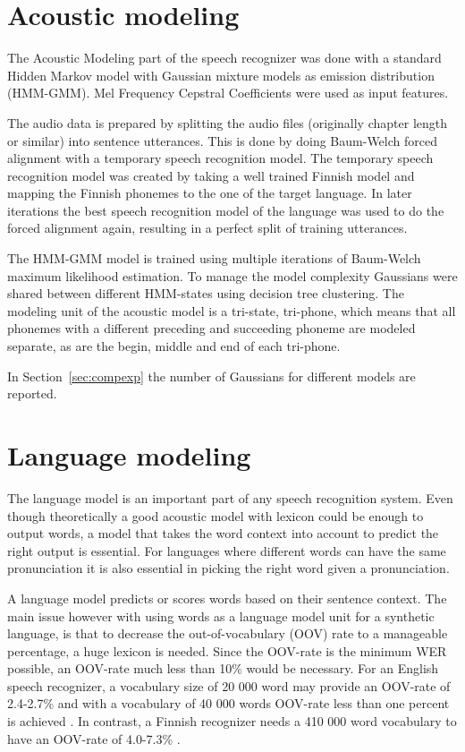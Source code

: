 \documentclass[b5paper]{article}
\newcommand{\ngram}{$n$-gram}
\begin{document}
\section{Acoustic modeling}
\label{sec:align}
The Acoustic Modeling part of the speech recognizer was done with a standard Hidden Markov model with Gaussian mixture models as emission distribution (HMM-GMM). Mel Frequency Cepstral Coefficients were used as input features. \cite{hirsimaki2009importance}

The audio data is prepared by splitting the audio files (originally chapter length or similar) into sentence utterances. This is done by doing Baum-Welch forced alignment with a temporary speech recognition model. The temporary speech recognition model was created by taking a well trained Finnish model and mapping the Finnish phonemes to the one of the target language. In later iterations the best speech recognition model of the language was used to do the forced alignment again, resulting in a perfect split of training utterances.

The HMM-GMM model is trained using multiple iterations of Baum-Welch maximum likelihood estimation. To manage the model complexity Gaussians were shared between different HMM-states using decision tree clustering. The modeling unit of the acoustic model is a tri-state, tri-phone, which means that all phonemes with a different preceding and succeeding phoneme are modeled separate, as are the begin, middle and end of each tri-phone.

In Section~\ref{sec:compexp} the number of Gaussians for different models are reported.


\section{Language modeling}

The language model is an important part of any speech recognition system. Even though theoretically a good acoustic model with lexicon could be enough to output words, a model that takes the word context into account to predict the right output is essential. For languages where different words can have the same pronunciation it is also essential in picking the right word given a pronunciation. 


A language model predicts or scores words based on their sentence context. The main issue however with using words as a language model unit for a synthetic language, is that to decrease the out-of-vocabulary (OOV) rate to a manageable percentage, a huge lexicon is needed. Since the OOV-rate is the minimum WER possible, an OOV-rate much less than 10\% would be necessary. For an English speech recognizer, a vocabulary size of 20 000 word may provide an OOV-rate of 2.4-2.7\% and with a vocabulary of 40 000 words OOV-rate less than one percent is achieved \cite{woodland19951994}. In contrast, a Finnish recognizer needs a 410 000 word vocabulary to have an OOV-rate of 4.0-7.3\% \cite{hirsimaki2006unlimited}.
\end{document}
